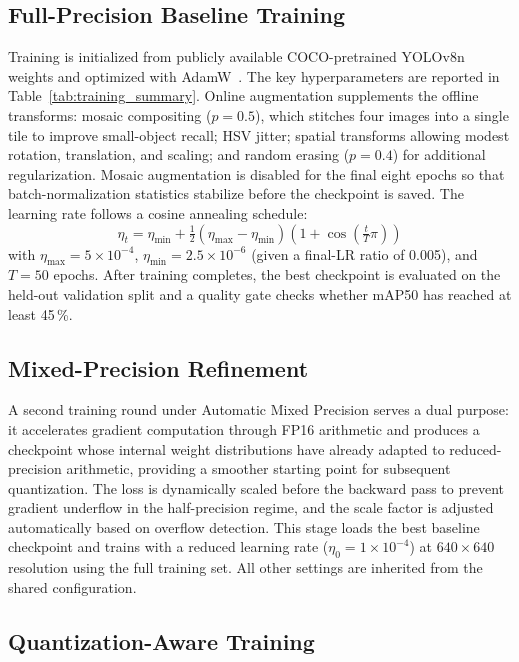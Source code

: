 \documentclass[conference]{IEEEtran}
\begin{document}
\subsection{Full-Precision Baseline Training}

Training is initialized from publicly available COCO-pretrained YOLOv8n weights and optimized with AdamW~\cite{b17}. The key hyperparameters are reported in Table~\ref{tab:training_summary}. Online augmentation supplements the offline transforms: mosaic compositing ($p{=}0.5$), which stitches four images into a single tile to improve small-object recall; HSV jitter; spatial transforms allowing modest rotation, translation, and scaling; and random erasing ($p{=}0.4$) for additional regularization. Mosaic augmentation is disabled for the final eight epochs so that batch-normalization statistics stabilize before the checkpoint is saved. The learning rate follows a cosine annealing schedule:
\begin{equation}
\eta_t = \eta_{\min} + \tfrac{1}{2}(\eta_{\max} - \eta_{\min})\!\left(1 + \cos\!\left(\tfrac{t}{T}\pi\right)\right)
\label{eq:cosine_lr}
\end{equation}
with $\eta_{\max} = 5\times10^{-4}$, $\eta_{\min} = 2.5\times10^{-6}$ (given a final-LR ratio of 0.005), and $T = 50$ epochs. After training completes, the best checkpoint is evaluated on the held-out validation split and a quality gate checks whether mAP50 has reached at least 45\,\%.

\subsection{Mixed-Precision Refinement}

A second training round under Automatic Mixed Precision serves a dual purpose: it accelerates gradient computation through FP16 arithmetic and produces a checkpoint whose internal weight distributions have already adapted to reduced-precision arithmetic, providing a smoother starting point for subsequent quantization. The loss is dynamically scaled before the backward pass to prevent gradient underflow in the half-precision regime, and the scale factor is adjusted automatically based on overflow detection. This stage loads the best baseline checkpoint and trains with a reduced learning rate ($\eta_0 = 1\times10^{-4}$) at $640{\times}640$ resolution using the full training set. All other settings are inherited from the shared configuration.

\subsection{Quantization-Aware Training}
\end{document}
